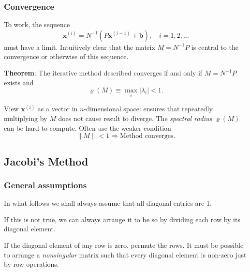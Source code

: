 \documentclass{beamer}
\newcommand{\bb}{{\boldsymbol{b}}}
\newcommand{\bx}{{\boldsymbol{x}}}
\begin{document}
\begin{frame}
  \frametitle{Convergence}

  To work, the sequence
  \begin{equation*}
    \bx^{(i)} = N^{-1} \left( P \bx^{(i - 1)} + \bb \right), \quad i =
    1, 2, \dots
  \end{equation*}
  must have a limit.  Intuitively clear that the matrix $M =
  N^{-1} P$ is central to the convergence or otherwise of
  this sequence.

  \vspace{1ex}

  {\bf Theorem}: The iterative method described converges if and only
  if $M = N^{-1} P$ exists and
  \begin{equation*}
    \varrho (M) \equiv \max_i | \lambda_i | < 1.
  \end{equation*}

  \begin{overlayarea}{\textwidth}{0.3\textheight}
    {
      View $\bx^{(i)}$ as a vector in $n$-dimensional space: ensures
      that repeatedly multiplying by $M$ does not cause result to
      diverge.
    }
    {
      The \emph{spectral radius} $\varrho (M)$ can be hard
      to compute. Often use the weaker condition
      \begin{equation*}
        \| M \| < 1 \Rightarrow \text{Method converges}.
      \end{equation*}
    }
  \end{overlayarea}

\end{frame}


\subsection{Jacobi's Method}

\begin{frame}
  \frametitle{General assumptions}

  \vspace{2ex}

  In what follows we shall always assume that all diagonal entries are
  1. \pause

  \vspace{2ex}

  If this is not true, we can always arrange it to be so by dividing
  each row by its diagonal element. \pause

  \vspace{2ex}

  If the diagonal element of any row is zero, permute the rows. It
  must be possible to arrange a \emph{nonsingular} matrix such that
  every diagonal element is non-zero just by row operations.

\end{frame}
\end{document}
